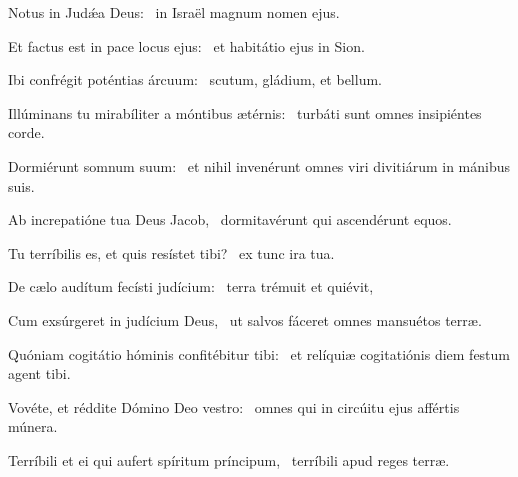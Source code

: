 \item Notus in Judǽa Deus:~\psstar{} in Israël magnum nomen ejus.

\item Et factus est in pace locus ejus:~\psstar{} et habitátio ejus in Sion.

\item Ibi confrégit poténtias árcuum:~\psstar{} scutum, gládium, et bellum.

\item Illúminans tu mirabíliter a móntibus ætérnis:~\psstar{} turbáti sunt omnes insipiéntes corde.

\item Dormiérunt somnum suum:~\psstar{} et nihil invenérunt omnes viri divitiárum in mánibus suis.

\item Ab increpatióne tua Deus Jacob,~\psstar{} dormitavérunt qui a\-scendérunt equos.

\item Tu terríbilis es, et quis resístet tibi?~\psstar{} ex tunc ira tua.

\item De cælo audítum fecísti judícium:~\psstar{} terra trémuit et quiévit,

\item Cum exsúrgeret in judícium Deus,~\psstar{} ut salvos fáceret omnes mansuétos terræ.

\item Quóniam cogitátio hóminis confitébitur tibi:~\psstar{} et relíquiæ cogitatiónis diem festum agent tibi.

\item Vovéte, et réddite Dómino Deo vestro:~\psstar{} omnes qui in circúitu ejus affértis múnera.

\item Terríbili et ei qui aufert spíritum príncipum,~\psstar{} terríbili apud reges terræ.

